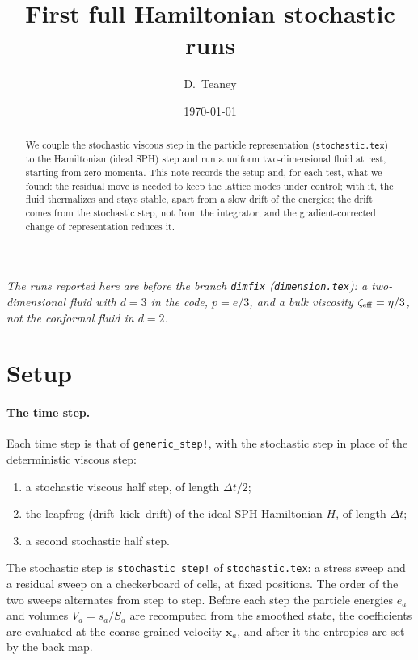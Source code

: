 \documentclass[11pt,aps,preprint,nofootinbib,superscriptaddress,tightenlines]{revtex4-2}
\let\oldparagraph\paragraph
\renewcommand{\paragraph}{\par\bigskip\oldparagraph}
\begin{document}
\title{First full Hamiltonian stochastic runs}
\author{D.~Teaney}
\date{\today}

\begin{abstract}
We couple the stochastic viscous step in the particle representation
(\texttt{stochastic.tex}) to the Hamiltonian (ideal SPH) step and run a uniform
two-dimensional fluid at rest, starting from zero momenta.  This note records
the setup and, for each test, what we found: the residual move is needed to
keep the lattice modes under control; with it, the fluid thermalizes and stays
stable, apart from a slow drift of the energies; the drift comes from the
stochastic step, not from the integrator, and the gradient-corrected change of
representation reduces it.
\end{abstract}

\maketitle

\noindent\emph{The runs reported here are before the branch \texttt{dimfix} (\texttt{dimension.tex}): a two-dimensional fluid with $d=3$ in the code,
$p=e/3$, and a bulk viscosity $\zeta_{\rm eff}=\eta/3$, not the conformal fluid in $d=2$.}

\section{Setup}
\label{sec:setup}

\paragraph{The time step.}  Each time step is that of \texttt{generic\_step!},
with the stochastic step in place of the deterministic viscous step:
\begin{enumerate}
\item a stochastic viscous half step, of length $\Delta t/2$;
\item the leapfrog (drift--kick--drift) of the ideal SPH Hamiltonian $H$, of
  length $\Delta t$;
\item a second stochastic half step.
\end{enumerate}
The stochastic step is \texttt{stochastic\_step!} of \texttt{stochastic.tex}: a
stress sweep and a residual sweep on a checkerboard of cells, at fixed
positions.  The order of the two sweeps alternates from step to step.  Before
each step the particle energies $e_a$ and volumes $V_a=s_a/S_a$ are recomputed from
the smoothed state, the coefficients are evaluated at the coarse-grained
velocity $\dot{\bm x}_a$, and after it the entropies are set by the back map.
\end{document}
